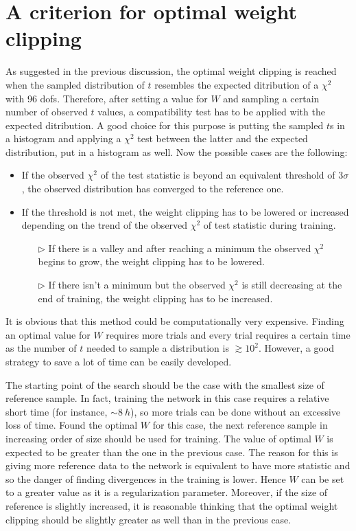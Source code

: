 \section{A criterion for optimal weight clipping}
As suggested in the previous discussion, the optimal weight clipping is reached when the sampled distribution of $t$ resembles the expected ditribution of a $\chi^2$ with 96 dofs. Therefore, after setting a value for $W$ and sampling a certain number of observed $t$ values, a compatibility test has to be applied with the expected ditribution. A good choice for this purpose is putting the sampled $t$s in a histogram and applying a $\chi^2$ test between the latter and the expected distribution, put in a histogram as well. Now the possible cases are the following:
\begin{itemize}
	\item If the observed $\chi^2$ of the test statistic is beyond an equivalent threshold of $3\sigma$, the observed distribution has converged to the reference one.
	\item If the threshold is not met, the weight clipping has to be lowered or increased depending on the trend of the observed $\chi^2$ of test statistic during training.
	\begin{itemize}
		\item[$\triangleright$] If there is a valley and after reaching a minimum the observed $\chi^2$ begins to grow, the weight clipping has to be lowered.
		\item[$\triangleright$] If there isn't a minimum but the observed $\chi^2$ is still decreasing at the end of training, the weight clipping has to be increased.
	\end{itemize}
\end{itemize}

It is obvious that this method could be computationally very expensive. Finding an optimal value for $W$ requires more trials and every trial requires a certain time as the number of $t$ needed to sample a distribution is $\gtrsim 10^2$. However, a good strategy to save a lot of time can be easily developed.

The starting point of the search should be the case with the smallest size of reference sample. In fact, training the network in this case requires a relative short time (for instance, $\sim 8~\si{h}$), so more trials can be done without an excessive loss of time. Found the optimal $W$ for this case, the next reference sample in increasing order of size should be used for training. The value of optimal $W$ is expected to be greater than the one in the previous case. The reason for this is giving more reference data to the network is equivalent to have more statistic and so the danger of finding divergences in the training is lower. Hence $W$ can be set to a greater value as it is a regularization parameter. Moreover, if the size of reference is slightly increased, it is reasonable thinking that the optimal weight clipping should be slightly greater as well than in the previous case.





